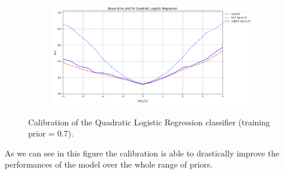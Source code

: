 \documentclass[12pt]{report}
\begin{document}
\begin{figure}[H]
    \centering
    \begin{subfigure}[t]{0.6\textwidth}
        \includegraphics[width=\textwidth]{./plot/calibration/QLR.png}
    \end{subfigure}
    \caption{Calibration of the Quadratic Logistic Regression classifier (training prior = 0.7).}
    \label{fig:calibration_QLR}
\end{figure}
\noindent
As we can see in this figure the calibration is able to drastically improve the performances of the model over the whole range of priors.
\end{document}
